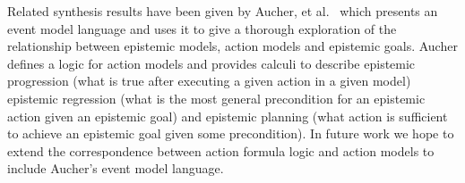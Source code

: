 Related synthesis results have been given by Aucher, et al.~\cite{aucher:2011,aucher:2012,aucher:2013} which presents an event model language and uses it to give a thorough exploration of the relationship between epistemic models, action models and epistemic goals.
Aucher defines a logic for action models and provides calculi to describe epistemic progression (what is true after executing a given action in a given model) epistemic regression (what is the most general precondition for an epistemic action given an epistemic goal) and epistemic planning (what action is sufficient to achieve an epistemic goal given some precondition).
In future work we hope to extend the correspondence between action formula logic and action models to include Aucher's event model language.

